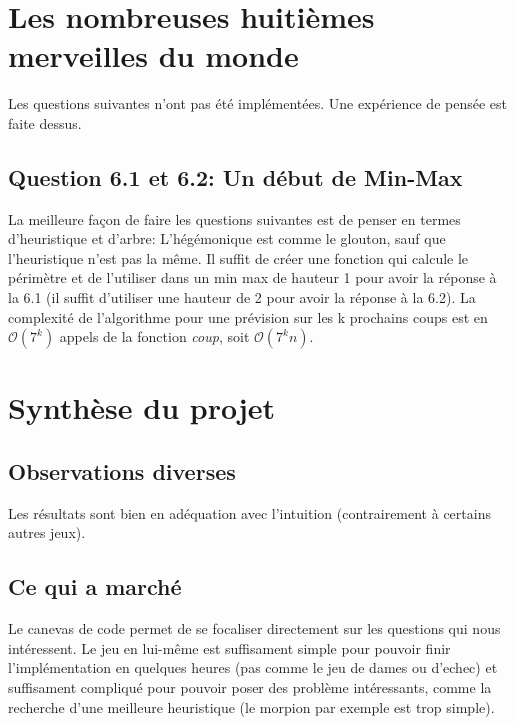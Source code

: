 \documentclass{article}
\begin{document}
    \section{Les nombreuses huitièmes merveilles du monde}

    Les questions suivantes n'ont pas été implémentées. Une expérience de pensée est faite dessus.

    \subsection*{Question 6.1 et 6.2: Un début de Min-Max}

    La meilleure façon de faire les questions suivantes est de penser en termes d'heuristique et d'arbre: L'hégémonique est comme le glouton, sauf que l'heuristique n'est pas la même. Il suffit de créer une fonction qui calcule le périmètre et de l'utiliser dans un min max de hauteur 1 pour avoir la réponse à la 6.1 (il suffit d'utiliser une hauteur de 2 pour avoir la réponse à la 6.2). La complexité de l'algorithme pour une prévision sur les k prochains coups est en $\mathcal{O}(7^k)$ appels de la fonction \textit{coup}, soit $\mathcal{O}(7^k n)$.

    \section*{Synthèse du projet}

    \subsection*{Observations diverses}

    Les résultats sont bien en adéquation avec l'intuition (contrairement à certains autres jeux).

    \subsection*{Ce qui a marché}

    Le canevas de code permet de se focaliser directement sur les questions qui nous intéressent. Le jeu en lui-même est suffisament simple pour pouvoir finir l'implémentation en quelques heures (pas comme le jeu de dames ou d'echec) et suffisament compliqué pour pouvoir poser des problème intéressants, comme la recherche d'une meilleure heuristique (le morpion par exemple est trop simple).
\end{document}
